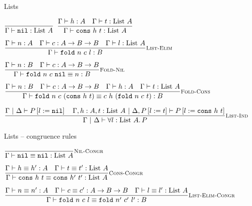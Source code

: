 \documentclass{beamer}
\begin{document}
\begin{frame}{Lists}

\begin{center}
  $\infrule{}{\typing{\nil}{\List{A}}}$ \quad
  $\infrule{\typing{h}{A} \quad \typing{t}{\List{A}}}{\typing{\cons{h}{t}}{\List{A}}}$

  \vspace{2em}

  $\infrule[List-Elim]{\typing{n}{A} \quad \typing{c}{\Fun{A}{\Fun{B}{B}}} \quad \typing{l}{\List{A}}}{\typing{\listelim{n}{c}{l}}{B}}$

  \vspace{2em}

  $\infrule[Fold-Nil]{\typing{n}{B} \quad \typing{c}{\Fun{A}{\Fun{B}{B}}}}{\compeq{\listelim{n}{c}{\nil}}{n}{B}}$

  \vspace{2em}

  $\infrule[Fold-Cons]{\typing{n}{B} \quad \typing{c}{\Fun{A}{\Fun{B}{B}}} \quad \typing{h}{A} \quad \typing{t}{\List{A}}}{\compeq{\listelim{n}{c}{(\cons{h}{t})}}{\app{\app{c}{h}}{(\listelim{n}{c}{t})}}{B}}$

  \vspace{2em}

  $\infrule[List-Ind]{\holds{\subst{P}{l}{\nil}} \quad \holds[\extend{\extend{\Gamma}{h}{A}}{t}{\List{A}}][\assume{\Delta}{\subst{P}{l}{t}}]{\subst{P}{l}{\cons{h}{t}}}}{\holds{\All{l}[\List{A}]{P}}}$
\end{center}

\end{frame}

\begin{frame}{Lists -- congruence rules}

\begin{center}
  $\infrule[Nil-Congr]{}{\compeq{\nil}{\nil}{\List{A}}}$

  \vspace{2em}

  $\infrule[Cons-Congr]{\compeq{h}{h'}{A} \quad \compeq{t}{t'}{\List{A}}}{\compeq{\cons{h}{t}}{\cons{h'}{t'}}{\List{A}}}$

  \vspace{2em}

  $\infrule[List-Elim-Congr]{\compeq{n}{n'}{A} \quad \compeq{c}{c'}{\Fun{A}{\Fun{B}{B}}} \quad \compeq{l}{l'}{\List{A}}}{\compeq{\listelim{n}{c}{l}}{\listelim{n'}{c'}{l'}}{B}}$
\end{center}

\end{frame}
\end{document}
